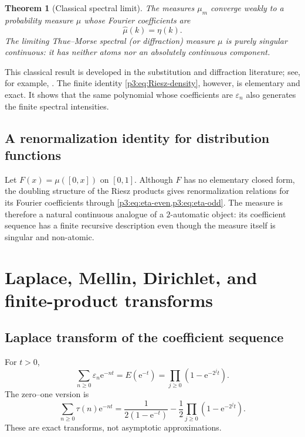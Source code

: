 \documentclass[11pt,oneside]{article}
\newtheorem{theorem}{Theorem}[section]
\theoremstyle{definition}
\theoremstyle{remark}
\newcommand{\e}{\mathrm e}
\newcommand{\eps}{\varepsilon}
\begin{document}
\begin{theorem}[Classical spectral limit]\label{p3:thm:riesz-limit}
The measures $\mu_m$ converge weakly to a probability measure $\mu$ whose
Fourier coefficients are
\begin{equation}\label{p3:eq:mu-fourier}
 \widehat\mu(k)=\eta(k).
\end{equation}
The limiting Thue--Morse spectral (or diffraction) measure $\mu$ is purely
singular continuous: it has neither atoms nor an absolutely continuous
component.
\end{theorem}

This classical result is developed in the substitution and diffraction
literature; see, for example,
\cite{p3:queffelec2010,p3:baakegrimm2008,p3:alloucheshallit2003}.  The finite identity
\cref{p3:eq:Riesz-density}, however, is elementary and exact.  It shows that the
same polynomial whose coefficients are $\eps_n$ also generates the finite
spectral intensities.

\subsection{A renormalization identity for distribution functions}

Let $F(x)=\mu([0,x])$ on $[0,1]$.  Although $F$ has no elementary closed form,
the doubling structure of the Riesz products gives renormalization relations
for its Fourier coefficients through \cref{p3:eq:eta-even,p3:eq:eta-odd}.  The
measure is therefore a natural continuous analogue of a $2$-automatic object:
its coefficient sequence has a finite recursive description even though the
measure itself is singular and non-atomic.

\section{Laplace, Mellin, Dirichlet, and finite-product transforms}

\subsection{Laplace transform of the coefficient sequence}

For $t>0$,
\begin{equation}\label{p3:eq:laplace-discrete}
 \sum_{n\ge0}\eps_n\e^{-nt}
 =E(\e^{-t})
 =\prod_{j\ge0}\left(1-\e^{-2^jt}\right).
\end{equation}
The zero--one version is
\begin{equation}\label{p3:eq:laplace-tau}
 \sum_{n\ge0}\tau(n)\e^{-nt}
 =\frac1{2(1-\e^{-t})}
  -\frac12\prod_{j\ge0}(1-\e^{-2^jt}).
\end{equation}
These are exact transforms, not asymptotic approximations.
\end{document}
